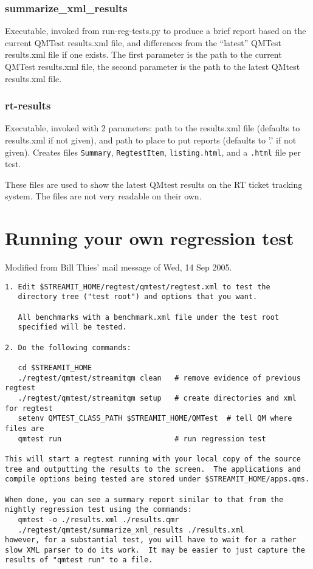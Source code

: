 \documentclass[11pt]{article}
\begin{document}
\subsubsection{summarize_xml_results}
Executable, invoked from run-reg-tests.py to produce a brief report based on
the current QMTest results.xml file, and differences from the ``latest''
QMTest results.xml file if one exists. The first parameter is the path to
the current QMTest results.xml file, the second parameter is the path to
the latest QMtest results.xml file.

\subsubsection{rt-results}
Executable, invoked with 2 parameters: path to the results.xml file (defaults
to results.xml if not given), 
and path to place to put reports (defaults to '.' if not given).
Creates files 
{\tt Summary}, 
{\tt RegtestItem}, 
{\tt listing.html},
and a {\tt .html} file per test.

These files are used to show the latest QMtest results on the 
RT ticket tracking system. 
 The files are not very readable on their own.


\section{Running your own regression test}

Modified from Bill Thies' mail message of  Wed, 14 Sep 2005.
\begin{verbatim}
1. Edit $STREAMIT_HOME/regtest/qmtest/regtest.xml to test the
   directory tree ("test root") and options that you want.

   All benchmarks with a benchmark.xml file under the test root
   specified will be tested.

2. Do the following commands:

   cd $STREAMIT_HOME
   ./regtest/qmtest/streamitqm clean   # remove evidence of previous regtest
   ./regtest/qmtest/streamitqm setup   # create directories and xml for regtest
   setenv QMTEST_CLASS_PATH $STREAMIT_HOME/QMTest  # tell QM where files are
   qmtest run                          # run regression test

This will start a regtest running with your local copy of the source
tree and outputting the results to the screen.  The applications and
compile options being tested are stored under $STREAMIT_HOME/apps.qms.

When done, you can see a summary report similar to that from the
nightly regression test using the commands:
   qmtest -o ./results.xml ./results.qmr 
   ./regtest/qmtest/summarize_xml_results ./results.xml
however, for a substantial test, you will have to wait for a rather
slow XML parser to do its work.  It may be easier to just capture the
results of "qmtest run" to a file.
\end{verbatim}
\end{document}
